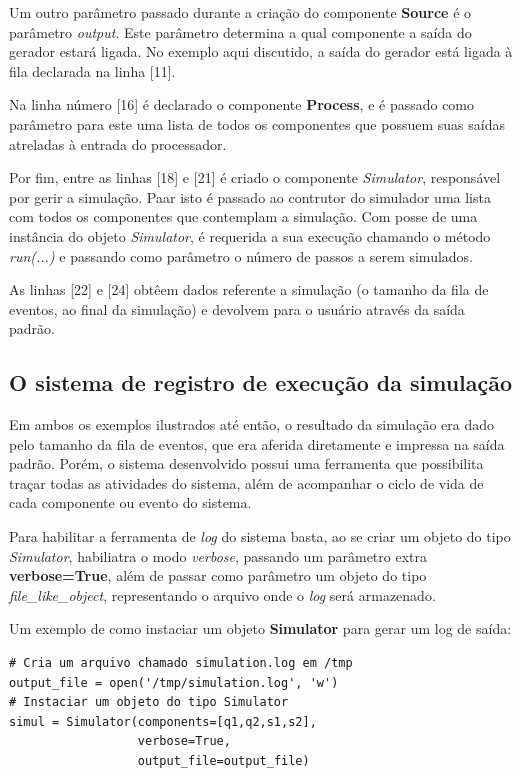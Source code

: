 Um outro parâmetro passado durante a criação do componente \textbf{Source} é o parâmetro \textit{output}. Este parâmetro determina a qual componente a saída do gerador estará ligada. No exemplo aqui discutido, a saída do gerador está ligada à fila declarada na linha [11].

Na linha número [16] é declarado o componente \textbf{Process}, e é passado como parâmetro para este uma lista de todos os componentes que possuem suas saídas atreladas à entrada do processador.

Por fim, entre as linhas [18] e [21] é criado o componente \textit{Simulator}, responsável por gerir a simulação. Paar isto é passado ao contrutor do simulador uma lista com todos os componentes que contemplam a simulação. Com posse de uma instância do objeto \textit{Simulator}, é requerida a sua execução chamando o método \textit{run(...)}  e passando como parâmetro o número de passos a serem simulados.

As linhas [22] e [24] obtêem dados referente a simulação (o tamanho da fila de eventos, ao final da simulação) e devolvem para o usuário através da saída padrão.



\subsection{O sistema de registro de execução da simulação}

Em ambos os exemplos ilustrados até então, o resultado da simulação era dado pelo tamanho da fila de eventos, que era aferida diretamente e impressa na saída padrão. Porém, o sistema desenvolvido possui uma ferramenta que possibilita traçar todas as atividades do sistema, além de acompanhar o ciclo de vida de cada componente ou evento do sistema.

Para habilitar a ferramenta de \textit{log} do sistema basta, ao se criar um objeto do tipo \textit{Simulator}, habiliatra o modo \textit{verbose}, passando um parâmetro extra \textbf{verbose=True}, além de passar como parâmetro um objeto do tipo \textit{file\_like\_object}, representando o arquivo onde o \textit{log} será armazenado.

Um exemplo de como instaciar um objeto \textbf{Simulator} para gerar um log de saída:

\begin{lstlisting}
# Cria um arquivo chamado simulation.log em /tmp
output_file = open('/tmp/simulation.log', 'w')
# Instaciar um objeto do tipo Simulator
simul = Simulator(components=[q1,q2,s1,s2], 
	              verbose=True, 
	              output_file=output_file)
\end{lstlisting}

